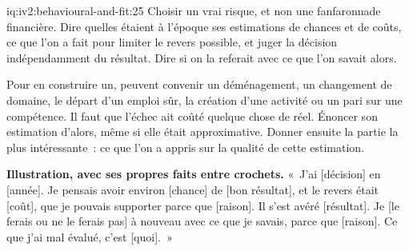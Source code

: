 \begin{solution}{iq:iv2:behavioural-and-fit:25}
Choisir un vrai risque, et non une fanfaronnade financière. Dire quelles étaient à l'époque ses estimations de chances et de coûts, ce que l'on a fait pour limiter le revers possible, et juger la décision indépendamment du résultat. Dire si on la referait avec ce que l'on savait alors.

Pour en construire un, peuvent convenir un déménagement, un changement de domaine, le départ d'un emploi sûr, la création d'une activité ou un pari sur une compétence. Il faut que l'échec ait coûté quelque chose de réel. Énoncer son estimation d'alors, même si elle était approximative. Donner ensuite la partie la plus intéressante~: ce que l'on a appris sur la qualité de cette estimation.

\textbf{Illustration, avec ses propres faits entre crochets.} «~J'ai [décision] en [année]. Je pensais avoir environ [chance] de [bon résultat], et le revers était [coût], que je pouvais supporter parce que [raison]. Il s'est avéré [résultat]. Je [le ferais ou ne le ferais pas] à nouveau avec ce que je savais, parce que [raison]. Ce que j'ai mal évalué, c'est [quoi].~»

\end{solution}

